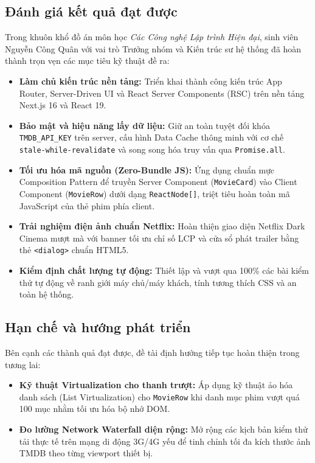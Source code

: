 \documentclass[12pt,a4paper]{extarticle}
\begin{document}
\subsection{Đánh giá kết quả đạt được}
Trong khuôn khổ đồ án môn học \textit{Các Công nghệ Lập trình Hiện đại}, sinh viên Nguyễn Công Quân với vai trò Trưởng nhóm và Kiến trúc sư hệ thống đã hoàn thành trọn vẹn các mục tiêu kỹ thuật đề ra:
\begin{itemize}[leftmargin=1.5em,itemsep=2pt,topsep=2pt]
    \item \textbf{Làm chủ kiến trúc nền tảng:} Triển khai thành công kiến trúc App Router, Server-Driven UI và React Server Components (RSC) trên nền tảng Next.js 16 và React 19.
    \item \textbf{Bảo mật và hiệu năng lấy dữ liệu:} Giữ an toàn tuyệt đối khóa \texttt{TMDB\_API\_KEY} trên server, cấu hình Data Cache thông minh với cơ chế \texttt{stale-while-revalidate} và song song hóa truy vấn qua \texttt{Promise.all}.
    \item \textbf{Tối ưu hóa mã nguồn (Zero-Bundle JS):} Ứng dụng chuẩn mực Composition Pattern để truyền Server Component (\texttt{MovieCard}) vào Client Component (\texttt{MovieRow}) dưới dạng \texttt{ReactNode[]}, triệt tiêu hoàn toàn mã JavaScript của thẻ phim phía client.
    \item \textbf{Trải nghiệm điện ảnh chuẩn Netflix:} Hoàn thiện giao diện Netflix Dark Cinema mượt mà với banner tối ưu chỉ số LCP và cửa sổ phát trailer bằng thẻ \texttt{<dialog>} chuẩn HTML5.
    \item \textbf{Kiểm định chất lượng tự động:} Thiết lập và vượt qua 100\% các bài kiểm thử tự động về ranh giới máy chủ/máy khách, tính tương thích CSS và an toàn hệ thống.
\end{itemize}

\subsection{Hạn chế và hướng phát triển}
Bên cạnh các thành quả đạt được, đề tài định hướng tiếp tục hoàn thiện trong tương lai:
\begin{itemize}[leftmargin=1.5em,itemsep=2pt,topsep=2pt]
    \item \textbf{Kỹ thuật Virtualization cho thanh trượt:} Áp dụng kỹ thuật ảo hóa danh sách (List Virtualization) cho \texttt{MovieRow} khi danh mục phim vượt quá 100 mục nhằm tối ưu hóa bộ nhớ DOM.
    \item \textbf{Đo lường Network Waterfall diện rộng:} Mở rộng các kịch bản kiểm thử tải thực tế trên mạng di động 3G/4G yếu để tinh chỉnh tối đa kích thước ảnh TMDB theo từng viewport thiết bị.
\end{itemize}
\end{document}
